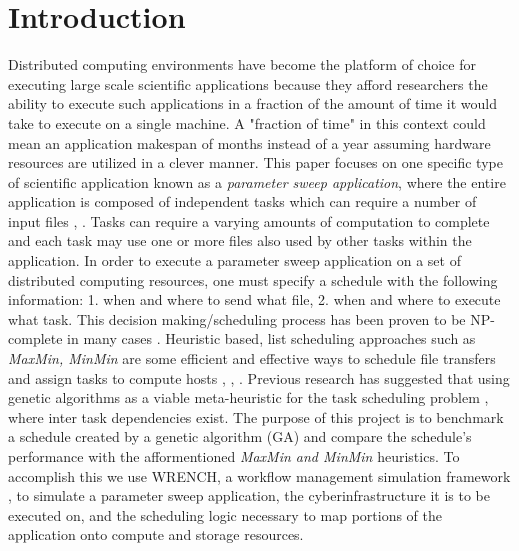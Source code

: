 \section{Introduction}

Distributed computing environments have become the platform of choice for
executing large scale scientific applications because they afford researchers
the ability to execute such applications in a fraction of the amount of time it
would take  to execute on a single machine. A "fraction of time" in this context
could mean an application makespan of months instead of a year assuming
hardware resources are utilized in a clever manner.  This paper focuses on one
specific type of scientific application known as a \textit{parameter sweep
application}, where the entire application is composed of independent tasks
which can require a number of input files  \cite{Casanova-param-sweep-00},
\cite{Casanova-apples-param-sweep-00}. Tasks can require a varying amounts of
computation to complete and each task may use one or more files also used by
other tasks within the application. In order to execute a parameter sweep
application on a set of distributed computing resources, one must specify a
schedule with the following information: 1. when and where to send what file, 2.
when and where to execute what task. This decision making/scheduling process
has been proven to be NP-complete in many cases
\cite{Giersch-task-sharing-files-04}. Heuristic based, list scheduling
approaches such as \textit{MaxMin, MinMin} are some
efficient and effective ways to schedule file transfers and assign tasks to
compute hosts \cite{Casanova-param-sweep-00},
\cite{Casanova-apples-param-sweep-00}, \cite{Giersch-task-sharing-files-04}. Previous
research has suggested that using genetic algorithms as a viable meta-heuristic
for the task scheduling problem \cite{wang-task-matching-97} ,
\cite{wu-incremental-genetic-04} where inter task dependencies exist. The purpose
of this project is to benchmark a schedule created by a genetic algorithm (GA)
and compare the schedule's performance with the afformentioned \textit{MaxMin and MinMin}
heuristics. To accomplish this we use WRENCH, a workflow management simulation
framework \cite{casanova-works-2018}, to simulate a parameter sweep application,
the cyberinfrastructure it is to be executed on, and the scheduling logic necessary
to map portions of the application onto compute and storage resources.
